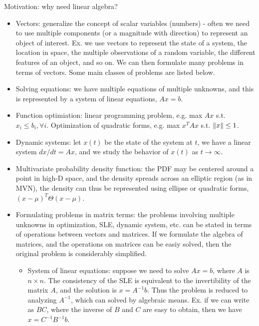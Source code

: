 \documentclass{report}
\begin{document}
Motivation: why need linear algebra? 
\begin{itemize}
	\item Vectors: generalize the concept of scalar variables (numbers) - often we need to use multiple components (or a magnitude with direction) to represent an object of interest. Ex. we use vectors to represent the state of a system, the location in space, the multiple observations of a random variable, the different features of an object, and so on. We can then formulate many problems in terms of vectors. Some main classes of problems are listed below. 
	
	\item Solving equations: we have multiple equations of multiple unknowns, and this is represented by a system of linear equations, $Ax = b$. 
	
	\item Function optimiation: linear programming problem, e.g. max $Ax$ s.t. $x_i \leq b_i, \forall i$. Optimization of quadratic forms, e.g. max $x^T A x$ s.t. $\lVert x\rVert \leq 1$. 
	
	\item Dynamic systems: let $x(t)$ be the state of the system at $t$, we have a linear system $dx/dt = A x$, and we study the behavior of $x(t)$ as $t \to \infty$. 
	
	\item Multivariate probability density function: the PDF may be centered around a point in high-D space, and the density spreads across an elliptic region (as in MVN), the density can thus be represented using ellipse or quadratic forms, $(x-\mu)^T \Theta (x-\mu)$. 
	
	\item Formulating problems in matrix terms: the problems involving multiple unknowns in optimization, SLE, dynamic system, etc. can be stated in terms of operations between vectors and matrices. If we formulate the algebra of matrices, and the operations on matrices can be easiy solved, then the original problem is considerably simplified. 
	\begin{itemize}
		\item System of linear equations: suppose we need to solve $Ax = b$, where $A$ is $n \times n$. The consistency of the SLE is equivalent to the invertibility of the matrix $A$, and the solution is $x = A^{-1} b$. Thus the problem is reduced to analyzing $A^{-1}$, which can solved by algebraic means. Ex. if we can write as $BC$, where the inverse of $B$ and $C$ are easy to obtain, then we have $x = C^{-1} B^{-1} b$. 
	\end{itemize}
\end{itemize}
\end{document}
